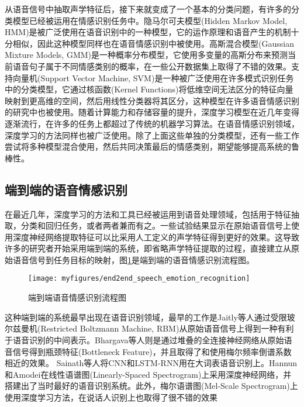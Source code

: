 从语音信号中抽取声学特征后，接下来就变成了一个基本的分类问题，有许多的分类模型已经被运用在情感识别任务中。隐马尔可夫模型(Hidden Markov Model, HMM)是被广泛使用在语音识别中的一种模型，它的运作原理和语音产生的机制十分相似，因此这种模型同样也在语音情感识别中被使用。高斯混合模型(Gaussian Mixture Models, GMM)是一种概率分布模型，它使用多变量的高斯分布来预测当前语音句子属于不同情感类别的概率，在一些公开数据集上取得了不错的效果。支持向量机(Support Vector Machine, SVM)是一种被广泛使用在许多模式识别任务中的分类模型，它通过核函数(Kernel Functions)将低维空间无法区分的特征向量映射到更高维的空间，然后用线性分类器将其区分，这种模型在许多语音情感识别的研究中也被使用。随着计算能力和存储容量的提升，深度学习模型在近几年变得逐渐流行，在许多的任务上都超过了传统的机器学习算法。在语音情感识别领域，深度学习的方法同样也被广泛使用。除了上面这些单独的分类模型，还有一些工作尝试将多种模型混合使用，然后共同决策最后的情感类别，期望能够提高系统的鲁棒性。

\subsection{端到端的语音情感识别}
\label{ssec:end2end_emo_rec}
在最近几年，深度学习的方法和工具已经被运用到语音处理领域，包括用于特征抽取，分类和回归任务，或者两者兼而有之。一些试验结果显示在原始语音信号上使用深度神经网络提取特征可以比采用人工定义的声学特征得到更好的效果。这导致许多的研究者开始采用端到端的系统，即省略声学特征提取的过程，直接建立从原始语音信号到任务目标的映射，图\ref{fig:end2end_speech_emotion_recognition}是端到端的语音情感识别流程图。

\begin{figure}[htb] %
    \centering
    \texttt{[image: myfigures/end2end\_speech\_emotion\_recognition]}
    \caption{端到端语音情感识别流程图}
    \label{fig:end2end_speech_emotion_recognition}
\end{figure}

这种端到端的系统最早出现在语音识别领域，最早的工作是Jaitly等人通过受限玻尔兹曼机(Restricted Boltzmann Machine, RBM)从原始语音信号上得到一种有利于语音识别的中间表示。Bhargava等人则是通过堆叠的全连接神经网络从原始语音信号得到瓶颈特征(Bottleneck Feature)，并且取得了和使用梅尔频率倒谱系数相近的效果。 Sainath等人将CNN和LSTM-RNN用在大词表语音识别上。Hannun和Amodei在线性语谱图(Linearly-Spaced Spectrogram)上采用深度神经网络，并搭建出了当时最好的语音识别系统。此外，梅尔语谱图(Mel-Scale Spectrogram)上使用深度学习方法，在说话人识别上也取得了很不错的效果

